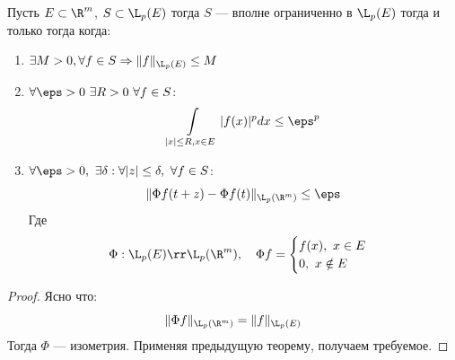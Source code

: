 \begin{next0}
	Пусть $E \subset \R^m$, $S \subset \L_p(E)$ тогда $S$ --- вполне ограниченно в $\L_p(E)$ тогда и только тогда когда:
	\begin{enumerate}
		\item $\exists M > 0, \forall f \in S \Rightarrow \|f\|_{\L_p(E)} \leq M$
		\item $\forall \eps > 0 \ \exists R > 0 \ \forall f \in S$:
		$$
		\int\limits_{|x| \leq R, x \in E} |f(x)|^p dx \leq \eps^p
		$$
		\item $\forall \eps > 0, \ \exists \delta :  \forall |z| \leq \delta, \ \forall f \in S$: 
		$$
		\| \Phi f (t + z) - \Phi f(t)\|_{\L_p(\R^m)} \leq \eps
		$$ 
		Где 
		$$
		\Phi : \L_p(E) \rr \L_p(\R^m), \quad \Phi f = \begin{cases}
			f(x), \ x\in E \\
			0, \ x \notin E
		\end{cases}
		$$
	\end{enumerate}
\end{next0}
\begin{proof}
	Ясно что:
	$$
	\|\Phi f\|_{\L_p(\R^m)} = \|f\|_{\L_p(E)}
	$$
	Тогда $\Phi$ --- изометрия. Применяя предыдущую теорему, получаем требуемое. 
\end{proof}

